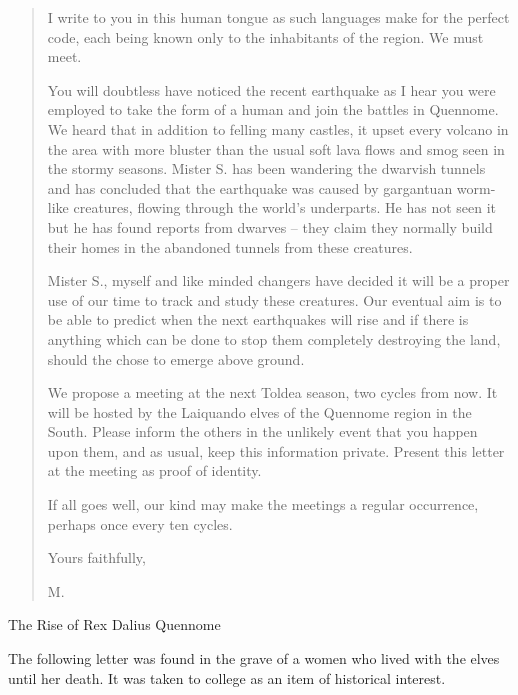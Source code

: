 \begin{multicols}{2}
\begin{quotation}
	I write to you in this human tongue as such languages make for the perfect code, each being known only to the inhabitants of the region.
	We must meet.

	You will doubtless have noticed the recent earthquake as I hear you were employed to take the form of a human and join the battles in Quennome.
	We heard that in addition to felling many castles, it upset every volcano in the area with more bluster than the usual soft lava flows and smog seen in the stormy seasons.
	Mister S. has been wandering the dwarvish tunnels and has concluded that the earthquake was caused by gargantuan worm-like creatures, flowing through the world's underparts.
	He has not seen it but he has found reports from dwarves -- they claim they normally build their homes in the abandoned tunnels from these creatures.

	Mister S., myself and like minded changers have decided it will be a proper use of our time to track and study these creatures.
	Our eventual aim is to be able to predict when the next earthquakes will rise and if there is anything which can be done to stop them completely destroying the land, should the chose to emerge above ground.

	We propose a meeting at the next Toldea season, two cycles from now.
	It will be hosted by the Laiquando elves of the Quennome region in the South.
	Please inform the others in the unlikely event that you happen upon them, and as usual, keep this information private.
	Present this letter at the meeting as proof of identity.

	If all goes well, our kind may make the meetings a regular occurrence, perhaps once every ten cycles.

	Yours faithfully,

	M.

\end{quotation}

The Rise of Rex Dalius Quennome\label{h_dalius}

The following letter was found in the grave of a women who lived with the elves until her death.
It was taken to \gls{college} as an item of historical interest.

\begin{quotation}


\end{quotation}
\end{multicols}
